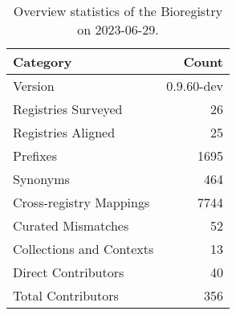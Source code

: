 \begin{table}
\caption{Overview statistics of the Bioregistry on 2023-06-29.}
\label{tab:bioregistry-summary}
\begin{tabular}{lr}
\toprule
Category & Count \\
\midrule
Version & 0.9.60-dev \\
Registries Surveyed & 26 \\
Registries Aligned & 25 \\
Prefixes & 1695 \\
Synonyms & 464 \\
Cross-registry Mappings & 7744 \\
Curated Mismatches & 52 \\
Collections and Contexts & 13 \\
Direct Contributors & 40 \\
Total Contributors & 356 \\
\bottomrule
\end{tabular}
\end{table}
